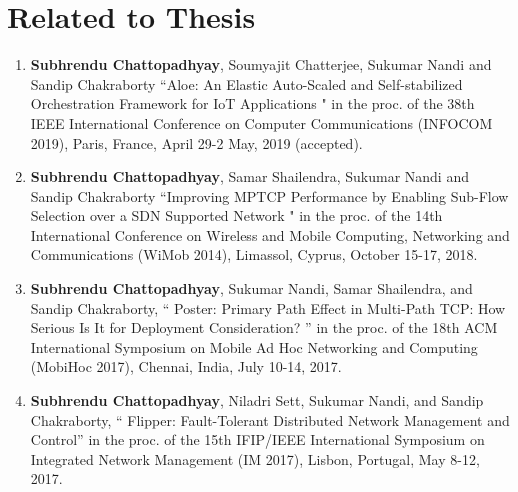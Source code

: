 \section*{Related to Thesis} 	
\begin{enumerate}
 \item \textbf{ Subhrendu Chattopadhyay}, Soumyajit Chatterjee, Sukumar Nandi and Sandip Chakraborty ``Aloe: An Elastic Auto-Scaled and Self-stabilized Orchestration Framework for IoT Applications "
in the proc. of the 38th IEEE International Conference on Computer Communications (INFOCOM 2019), Paris, France, April 29-2 May, 2019 (accepted).
 \item  \textbf{ Subhrendu Chattopadhyay}, Samar Shailendra, Sukumar Nandi and Sandip Chakraborty ``Improving MPTCP Performance by Enabling Sub-Flow Selection over a SDN Supported Network "
in the proc. of the 14th International Conference on Wireless and Mobile Computing, Networking and Communications (WiMob 2014), Limassol, Cyprus, October 15-17, 2018.  
 \item \textbf{Subhrendu Chattopadhyay}, Sukumar Nandi, Samar Shailendra, and Sandip Chakraborty, `` Poster: Primary Path Effect in Multi-Path TCP: How Serious Is It for Deployment Consideration? '' in the proc. of the 18th ACM International Symposium on Mobile Ad Hoc Networking and Computing (MobiHoc 2017), Chennai, India, July 10-14, 2017.
 \item \textbf{Subhrendu Chattopadhyay}, Niladri Sett, Sukumar Nandi, and Sandip Chakraborty, `` Flipper: Fault-Tolerant Distributed Network Management and Control''  in the proc. of the 15th IFIP/IEEE International Symposium on Integrated Network Management (IM 2017), Lisbon, Portugal, May 8-12, 2017.
\end{enumerate}

